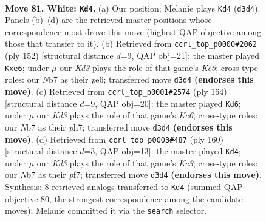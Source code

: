 \documentclass[11pt]{article}
\begin{document}
\clearpage

\begin{figure}[p]\centering
\begin{subfigure}{0.46\textwidth}\centering
\resizebox{\linewidth}{!}{%
\newchessgame
\chessboard[
  setfen={6k1/1NP5/2r5/8/8/3K2B1/8/8 w - - 75 81},
  showmover=false,
  pgfstyle=straightmove, color=movearrow, markmove={d3-d4}
]}
\caption{}
\end{subfigure}\hfill
\begin{subfigure}{0.46\textwidth}\centering
\resizebox{\linewidth}{!}{%
\newchessgame
\chessboard[
  setfen={r7/P7/4p3/4K3/2k5/8/5B2/8 w - - 1 77},
  showmover=false,
  pgfstyle=straightmove, color=movearrow, markmove={e5-e6}
]}
\caption{}
\end{subfigure}
\\[4pt]
\begin{subfigure}{0.46\textwidth}\centering
\resizebox{\linewidth}{!}{%
\newchessgame
\chessboard[
  setfen={8/6Bp/2K4P/7r/4k3/8/8/8 w - - 25 83},
  showmover=false,
  pgfstyle=straightmove, color=movearrow, markmove={c6-d6}
]}
\caption{}
\end{subfigure}\hfill
\begin{subfigure}{0.46\textwidth}\centering
\resizebox{\linewidth}{!}{%
\newchessgame
\chessboard[
  setfen={8/1P3p2/3k4/1r6/4B3/2K5/8/8 w - - 35 81},
  showmover=false,
  pgfstyle=straightmove, color=movearrow, markmove={c3-d4}
]}
\caption{}
\end{subfigure}
\caption{\textbf{Move 81, White: \texttt{Kd4}.} (a) Our position; Melanie plays \texttt{Kd4} (\texttt{d3d4}). Panels (b)--(d) are the retrieved master positions whose correspondence most drove this move (highest QAP objective among those that transfer to it). (b) Retrieved from \texttt{ccrl\_top\_p0000\#2062} (ply 152) [structural distance $d$=9, QAP obj=21]: the master played \texttt{Kxe6}; under $\mu$ our \emph{Kd3} plays the role of that game's \emph{Ke5}; cross-type roles: our \emph{N}b7 as their \emph{p}e6; transferred move \texttt{d3d4} \textbf{(endorses this move)}. (c) Retrieved from \texttt{ccrl\_top\_p0001\#2574} (ply 164) [structural distance $d$=9, QAP obj=20]: the master played \texttt{Kd6}; under $\mu$ our \emph{Kd3} plays the role of that game's \emph{Kc6}; cross-type roles: our \emph{N}b7 as their \emph{p}h7; transferred move \texttt{d3d4} \textbf{(endorses this move)}. (d) Retrieved from \texttt{ccrl\_top\_p0003\#487} (ply 160) [structural distance $d$=3, QAP obj=13]: the master played \texttt{Kd4}; under $\mu$ our \emph{Kd3} plays the role of that game's \emph{Kc3}; cross-type roles: our \emph{N}b7 as their \emph{p}f7; transferred move \texttt{d3d4} \textbf{(endorses this move)}. Synthesis: 8 retrieved analogs transferred to \texttt{Kd4} (summed QAP objective 80, the strongest correspondence among the candidate moves); Melanie committed it via the \texttt{search} selector.}
\label{fig:thought-m160}
\end{figure}
\end{document}

